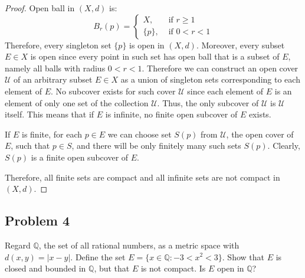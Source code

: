 \documentclass{article}
\begin{document}
\begin{proof}

Open ball in $(X, d)$ is:
$$ B_r(p)=
\begin{cases}
X, & \text{ if } r \geq 1 \\
\{ p \}, & \text{ if } 0 < r < 1
\end{cases}
$$
Therefore, every singleton set $\{ p \}$ is open in $(X, d)$. Moreover, every subset $E \in X$ is open since every point in such set has open ball that is a subset of $E$, namely all balls with radius $0 < r < 1$. Therefore we can construct an open cover $\mathcal{U}$ of an arbitrary subset $E \in X$ as a union of singleton sets corresponding to each element of $E$. No subcover exists for such cover $\mathcal{U}$ since each element of $E$ is an element of only one set of the collection $\mathcal{U}$. Thus, the only subcover of $\mathcal{U}$ is $\mathcal{U}$ itself. This means that if $E$ is infinite, no finite open subcover of $E$ exists.

If $E$ is finite, for each $p \in E$ we can choose set $S(p)$ from $\mathcal{U}$, the open cover of $E$, such that $p \in S$, and there will be only finitely many such sets $S(p)$. Clearly, $S(p)$ is a finite open subcover of $E$.

Therefore, all finite sets are compact and all infinite sets are not compact in $(X, d)$.

\end{proof}

\subsection*{Problem 4}

\begin{tcolorbox}
Regard $\mathbb{Q}$, the set of all rational numbers, as a metric space with $d(x, y) = |x - y|$. Define
the set $E = \{x \in \mathbb{Q} : -3 < x^2 < 3\}$. Show that $E$ is closed and bounded in $\mathbb{Q}$, but that $E$ is not compact. Is $E$ open in $\mathbb{Q}$?
\end{tcolorbox}
\end{document}
